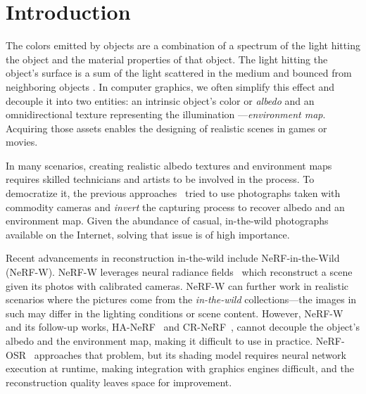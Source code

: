 \section{Introduction}
  \label{sec:lumigauss-introduction}

  The colors emitted by objects are a combination of a spectrum of the light
  hitting the object and the material properties of that object.
  The light hitting the object's surface is a sum of the light scattered in
  the medium and bounced from neighboring objects \cite{whitted1979improved}.
  In computer graphics, we often simplify this effect and decouple it into two
  entities: an intrinsic object's color or \textit{albedo} and an
  omnidirectional texture representing the illumination
  \cite{ramamoorthi2001envmap}---\textit{environment map}.
  Acquiring those assets enables the designing of realistic scenes in games or
  movies.

  In many scenarios, creating realistic albedo textures and environment maps
  requires skilled technicians and artists to be involved in the process.
  To democratize it, the previous approaches~\cite{rudnev2022nerfosr,
  gardner2023neusky, wang2023fegr} tried to use photographs taken with
  commodity cameras and \textit{invert} the capturing process to recover
  albedo and an environment map.
  Given the abundance of casual, in-the-wild photographs available on the
  Internet, solving that issue is of high importance.

  Recent advancements in reconstruction in-the-wild include
  NeRF-in-the-Wild~\cite{martin2021nerfw} (NeRF-W).
  NeRF-W leverages neural radiance fields~\cite{mildenhall2021nerf} which
  reconstruct a scene given its photos with calibrated cameras.
  NeRF-W can further work in realistic scenarios where the pictures come from
  the \textit{in-the-wild} collections---the images in such may differ in the
  lighting conditions or scene content.
  However, NeRF-W and its follow-up works, HA-NeRF~\cite{chen2022hallucinated}
  and CR-NeRF~\cite{yang2023crnerf}, cannot decouple the object's albedo and
  the environment map, making it difficult to use in practice.
  NeRF-OSR~\cite{rudnev2022nerfosr} approaches that problem, but its shading
  model requires neural network execution at runtime, making integration with
  graphics engines difficult, and the reconstruction quality leaves space for
  improvement.

